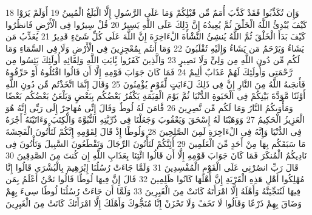 \documentclass[20pt,a4paper]{article}
\begin{document}
{\tiny\colorbox{cl_aya}{18}} وَإِن تُكَذِّبُوا فَقَدْ كَذَّبَ أُمَمٌ مِّن قَبْلِكُمْ وَمَا عَلَى الرَّسُولِ إِلَّا الْبَلَغُ الْمُبِينُ
{\tiny\colorbox{cl_aya}{19}} أَوَلَمْ يَرَوْا كَيْفَ يُبْدِئُ اللَّهُ الْخَلْقَ ثُمَّ يُعِيدُهُ إِنَّ ذَلِكَ عَلَى اللَّهِ يَسِيرٌ
{\tiny\colorbox{cl_aya}{20}} قُلْ سِيرُوا فِى الْأَرْضِ فَانظُرُوا كَيْفَ بَدَأَ الْخَلْقَ ثُمَّ اللَّهُ يُنشِئُ النَّشْأَةَ الْءَاخِرَةَ إِنَّ اللَّهَ عَلَى كُلِّ شَىْءٍ قَدِيرٌ
{\tiny\colorbox{cl_aya}{21}} يُعَذِّبُ مَن يَشَاءُ وَيَرْحَمُ مَن يَشَاءُ وَإِلَيْهِ تُقْلَبُونَ
{\tiny\colorbox{cl_aya}{22}} وَمَا أَنتُم بِمُعْجِزِينَ فِى الْأَرْضِ وَلَا فِى السَّمَاءِ وَمَا لَكُم مِّن دُونِ اللَّهِ مِن وَلِىٍّ وَلَا نَصِيرٍ
{\tiny\colorbox{cl_aya}{23}} وَالَّذِينَ كَفَرُوا بَِٔايَتِ اللَّهِ وَلِقَائِهِ أُولَئِكَ يَئِسُوا مِن رَّحْمَتِى وَأُولَئِكَ لَهُمْ عَذَابٌ أَلِيمٌ
{\tiny\colorbox{cl_aya}{24}} فَمَا كَانَ جَوَابَ قَوْمِهِ إِلَّا أَن قَالُوا اقْتُلُوهُ أَوْ حَرِّقُوهُ فَأَنجَىهُ اللَّهُ مِنَ النَّارِ إِنَّ فِى ذَلِكَ لَءَايَتٍ لِّقَوْمٍ يُؤْمِنُونَ
{\tiny\colorbox{cl_aya}{25}} وَقَالَ إِنَّمَا اتَّخَذْتُم مِّن دُونِ اللَّهِ أَوْثَنًا مَّوَدَّةَ بَيْنِكُمْ فِى الْحَيَوةِ الدُّنْيَا ثُمَّ يَوْمَ الْقِيَمَةِ يَكْفُرُ بَعْضُكُم بِبَعْضٍ وَيَلْعَنُ بَعْضُكُم بَعْضًا وَمَأْوَىكُمُ النَّارُ وَمَا لَكُم مِّن نَّصِرِينَ
{\tiny\colorbox{cl_aya}{26}} فََٔامَنَ لَهُ لُوطٌ وَقَالَ إِنِّى مُهَاجِرٌ إِلَى رَبِّى إِنَّهُ هُوَ الْعَزِيزُ الْحَكِيمُ
{\tiny\colorbox{cl_aya}{27}} وَوَهَبْنَا لَهُ إِسْحَقَ وَيَعْقُوبَ وَجَعَلْنَا فِى ذُرِّيَّتِهِ النُّبُوَّةَ وَالْكِتَبَ وَءَاتَيْنَهُ أَجْرَهُ فِى الدُّنْيَا وَإِنَّهُ فِى الْءَاخِرَةِ لَمِنَ الصَّلِحِينَ
{\tiny\colorbox{cl_aya}{28}} وَلُوطًا إِذْ قَالَ لِقَوْمِهِ إِنَّكُمْ لَتَأْتُونَ الْفَحِشَةَ مَا سَبَقَكُم بِهَا مِنْ أَحَدٍ مِّنَ الْعَلَمِينَ
{\tiny\colorbox{cl_aya}{29}} أَئِنَّكُمْ لَتَأْتُونَ الرِّجَالَ وَتَقْطَعُونَ السَّبِيلَ وَتَأْتُونَ فِى نَادِيكُمُ الْمُنكَرَ فَمَا كَانَ جَوَابَ قَوْمِهِ إِلَّا أَن قَالُوا ائْتِنَا بِعَذَابِ اللَّهِ إِن كُنتَ مِنَ الصَّدِقِينَ
{\tiny\colorbox{cl_aya}{30}} قَالَ رَبِّ انصُرْنِى عَلَى الْقَوْمِ الْمُفْسِدِينَ
{\tiny\colorbox{cl_aya}{31}} وَلَمَّا جَاءَتْ رُسُلُنَا إِبْرَهِيمَ بِالْبُشْرَى قَالُوا إِنَّا مُهْلِكُوا أَهْلِ هَذِهِ الْقَرْيَةِ إِنَّ أَهْلَهَا كَانُوا ظَلِمِينَ
{\tiny\colorbox{cl_aya}{32}} قَالَ إِنَّ فِيهَا لُوطًا قَالُوا نَحْنُ أَعْلَمُ بِمَن فِيهَا لَنُنَجِّيَنَّهُ وَأَهْلَهُ إِلَّا امْرَأَتَهُ كَانَتْ مِنَ الْغَبِرِينَ
{\tiny\colorbox{cl_aya}{33}} وَلَمَّا أَن جَاءَتْ رُسُلُنَا لُوطًا سِىءَ بِهِمْ وَضَاقَ بِهِمْ ذَرْعًا وَقَالُوا لَا تَخَفْ وَلَا تَحْزَنْ إِنَّا مُنَجُّوكَ وَأَهْلَكَ إِلَّا امْرَأَتَكَ كَانَتْ مِنَ الْغَبِرِينَ
\end{document}
